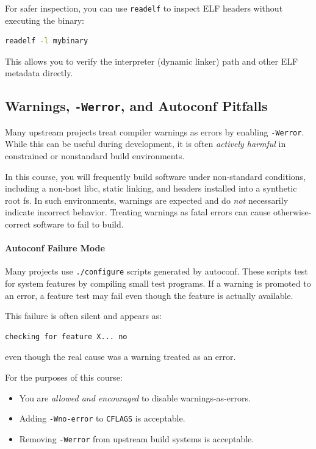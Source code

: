 \documentclass{../juni}
\begin{document}
For safer inspection, you can use \texttt{readelf} to inspect ELF headers
without executing the binary:

\begin{lstlisting}[language=bash]
readelf -l mybinary
\end{lstlisting}

This allows you to verify the interpreter (dynamic linker) path and other ELF
metadata directly.

\subsection{Warnings, \texttt{-Werror}, and Autoconf Pitfalls}

Many upstream projects treat compiler warnings as errors by enabling
\texttt{-Werror}. While this can be useful during development, it is often
\emph{actively harmful} in constrained or nonstandard build environments.

In this course, you will frequently build software under non-standard
conditions, including a non-host libc, static linking, and headers installed
into a synthetic root fs. In such environments, warnings are expected and do
\emph{not} necessarily indicate incorrect behavior. Treating warnings as fatal
errors can cause otherwise-correct software to fail to build.

\paragraph{Autoconf Failure Mode}
Many projects use \texttt{./configure} scripts generated by autoconf. These
scripts test for system features by compiling small test programs. If a
warning is promoted to an error, a feature test may fail even though the
feature is actually available.

This failure is often silent and appears as:
\begin{verbatim}
checking for feature X... no
\end{verbatim}
even though the real cause was a warning treated as an error.

For the purposes of this course:
\begin{itemize}
  \item You are \emph{allowed and encouraged} to disable warnings-as-errors.
  \item Adding \texttt{-Wno-error} to \texttt{CFLAGS} is acceptable.
  \item Removing \texttt{-Werror} from upstream build systems is acceptable.
\end{itemize}
\end{document}
